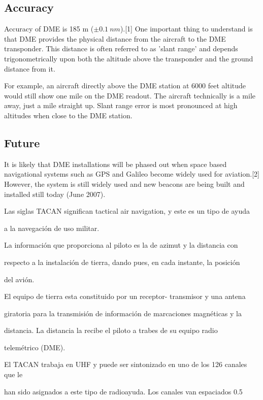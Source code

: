 \subsection*{Accuracy}
\label{Accuracy}


Accuracy of DME is 185 m ($\pm 0.1 \ nm $).[1] One important thing to understand is that DME provides the physical distance from the aircraft to the DME transponder. This distance is often referred to as 'slant range' and depends trigonometrically upon both the altitude above the transponder and the ground distance from it.

For example, an aircraft directly above the DME station at 6000 feet altitude would still show one mile on the DME readout. The aircraft technically is a mile away, just a mile straight up. Slant range error is most pronounced at high altitudes when close to the DME station.

\subsection*{Future}
\label{Future}


It is likely that DME installations will be phased out when space based navigational systems such as GPS and Galileo become widely used for aviation.[2] However, the system is still widely used and new beacons are being built and installed still today (June 2007).


Las siglas TACAN significan  tactical air navigation, y este es un tipo de ayuda

a la navegación de uso militar.

La información que proporciona al piloto es la de azimut y la distancia  con

respecto a la instalación de tierra, dando pues, en cada instante, la posición

del avión.

El equipo de tierra esta constituido por un receptor- transmisor y una antena

giratoria para la transmisión de información de marcaciones magnéticas y la

distancia. La distancia la recibe el piloto a trabes de su equipo radio

telemétrico (DME).

El TACAN trabaja en UHF y puede ser sintonizado en uno de los 126 canales que le

han sido asignados a este tipo de radioayuda. Los canales van espaciados 0.5


